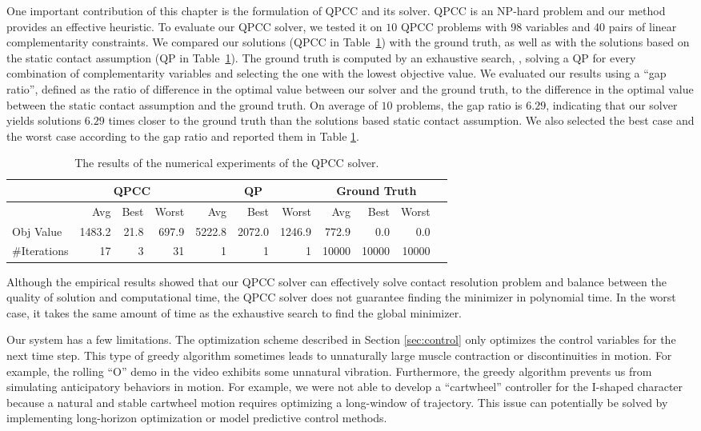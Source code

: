 One important contribution of this chapter is the formulation of QPCC and its solver.
QPCC is an NP-hard problem \cite{Braun:2005} and our method provides an effective heuristic.
To evaluate our QPCC solver, we tested it on $10$
QPCC problems with 98 variables and 40 pairs of linear complementarity
constraints. We compared our solutions (QPCC in Table~\ref{tab:qpcc}) with the ground truth, as well
as with the solutions based on the static contact assumption (QP in Table~\ref{tab:qpcc}). The
ground truth is computed by an exhaustive search, \ie, solving a QP
for every combination of complementarity variables and selecting the one
with the lowest objective value. We evaluated our results using a ``gap
ratio'', defined as the ratio of difference in the optimal value between
our solver and the ground truth, to the difference in the optimal value
between the static contact assumption and the ground truth. On average
of $10$ problems, the gap ratio is $6.29$, indicating that our solver
yields solutions $6.29$ times closer to the ground truth than the
solutions based static contact assumption. We also selected the best
case and the worst case according to the gap ratio and reported them
in Table \ref{tab:qpcc}.
\begin{table}
\centering
\begin{tabular}{|l|r|r|r|r|r|r|r|r|r|r|}
\hline
&\multicolumn{3}{|c|}{QPCC} & \multicolumn{3}{|c|}{QP}  & \multicolumn{3}{|c|}{Ground Truth} \\ \hline
& Avg & Best & Worst & Avg & Best & Worst & Avg & Best & Worst \\ \hline
Obj Value & 1483.2 & 21.8 & 697.9 & 5222.8 & 2072.0& 1246.9 & 772.9 & 0.0 & 0.0 \\ \hline
\#Iterations & 17 & 3 & 31 & 1 & 1 & 1 & 10000 & 10000 & 10000 \\
\hline
\end{tabular}
 \caption{The results of the numerical experiments of the QPCC solver. }
 \label{tab:qpcc}
\end{table}
Although the empirical results showed that our QPCC solver can
effectively solve contact resolution problem and balance between the
quality of solution and computational time, the QPCC solver does not
guarantee finding the minimizer in polynomial time. In the
worst case, it takes the same amount of time as the exhaustive search
to find the global minimizer.

Our system has a few limitations.  The
optimization scheme described in Section \ref{sec:control} only
optimizes the control variables for the next time step. This type of
greedy algorithm sometimes leads to unnaturally large muscle contraction or
discontinuities in motion. For example, the rolling ``O'' demo in the
video exhibits some unnatural vibration. Furthermore, the greedy algorithm prevents us
from simulating anticipatory behaviors in motion. For example, we were
not able to develop a ``cartwheel'' controller for the I-shaped
character because a natural and stable cartwheel motion requires
optimizing a long-window of trajectory. This issue can potentially be
solved by implementing long-horizon optimization or model predictive
control methods.

